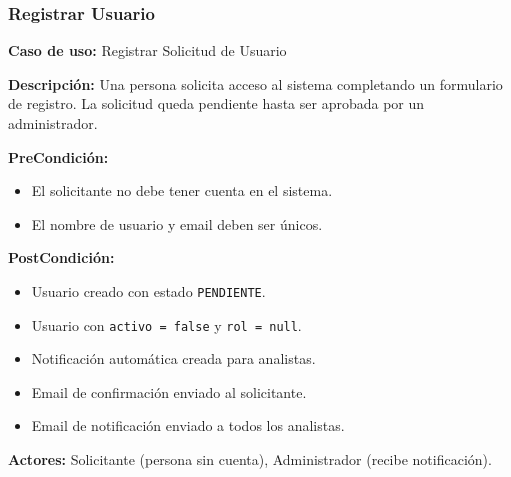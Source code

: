 \subsubsection{Registrar Usuario}

\noindent\textbf{Caso de uso:} Registrar Solicitud de Usuario

\vspace{0.5em}
\noindent\textbf{Descripción:} Una persona solicita acceso al sistema completando un formulario de registro. La solicitud queda pendiente hasta ser aprobada por un administrador.

\vspace{0.5em}
\noindent\textbf{PreCondición:}
\begin{itemize}[nosep]
    \item El solicitante no debe tener cuenta en el sistema.
    \item El nombre de usuario y email deben ser únicos.
\end{itemize}

\vspace{0.5em}
\noindent\textbf{PostCondición:}
\begin{itemize}[nosep]
    \item Usuario creado con estado \texttt{PENDIENTE}.
    \item Usuario con \texttt{activo = false} y \texttt{rol = null}.
    \item Notificación automática creada para analistas.
    \item Email de confirmación enviado al solicitante.
    \item Email de notificación enviado a todos los analistas.
\end{itemize}

\vspace{0.5em}
\noindent\textbf{Actores:} Solicitante (persona sin cuenta), Administrador (recibe notificación).

